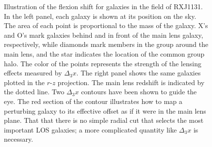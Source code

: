 \documentclass{emulateapj}
\begin{document}
\begin{figure}[t]
\begin{center}
\caption{\label{fig:fieldrz} Illustration of the flexion shift for galaxies in the field of RXJ1131.  In the left panel, each galaxy is shown at its position on the sky.  The area of each point is proportional to the mass of the galaxy.  X's and O's mark galaxies behind and in front of the main lens galaxy, respectively, while diamonds mark members in the group around the main lens, and the star indicates the location of the common group halo.  The color of the points represents the strength of the lensing effects measured by $\Delta_3 x$. The right panel shows the same galaxies plotted in the $r$-$z$ projection. The main lens redshift is indicated by the dotted line. Two $\Delta_3 x$ contours have been shown to guide the eye. The red section of the contour illustrates how to map a perturbing galaxy to its effective offset as if it were in the main lens plane. That that there is no simple radial cut that selects the most important LOS galaxies; a more complicated quantity like $\Delta_3 x$ is necessary.%
}
\end{center}
\end{figure}
\end{document}
